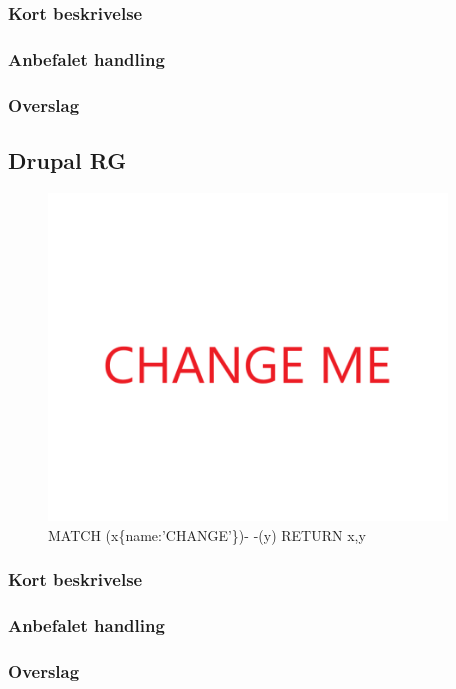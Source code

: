 \documentclass{article}
\begin{document}
\subsubsection{Kort beskrivelse}
\subsubsection{Anbefalet handling}
\subsubsection{Overslag}
\subsection{Drupal RG}
\begin{figure}[h]
\includegraphics[width=300pt]{CHANGE.PNG}
\caption{MATCH (x\{name:'CHANGE'\})- -(y) RETURN x,y}
\end{figure}
\subsubsection{Kort beskrivelse}
\subsubsection{Anbefalet handling}
\subsubsection{Overslag}
\end{document}
